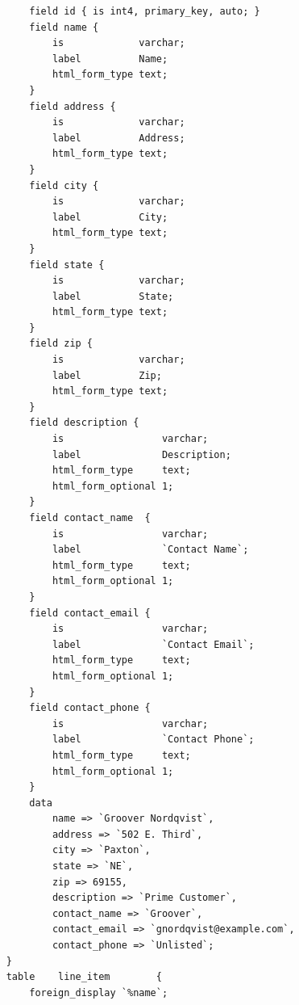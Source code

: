 \begin{verbatim}
        field id { is int4, primary_key, auto; }
        field name {
            is             varchar;
            label          Name;
            html_form_type text;
        }
        field address {
            is             varchar;
            label          Address;
            html_form_type text;
        }
        field city {
            is             varchar;
            label          City;
            html_form_type text;
        }
        field state {
            is             varchar;
            label          State;
            html_form_type text;
        }
        field zip {
            is             varchar;
            label          Zip;
            html_form_type text;
        }
        field description {
            is                 varchar;
            label              Description;
            html_form_type     text;
            html_form_optional 1;
        }
        field contact_name  {
            is                 varchar;
            label              `Contact Name`;
            html_form_type     text;
            html_form_optional 1;
        }
        field contact_email {
            is                 varchar;
            label              `Contact Email`;
            html_form_type     text;
            html_form_optional 1;
        }
        field contact_phone {
            is                 varchar;
            label              `Contact Phone`;
            html_form_type     text;
            html_form_optional 1;
        }
        data
            name => `Groover Nordqvist`,
            address => `502 E. Third`,
            city => `Paxton`,
            state => `NE`,
            zip => 69155,
            description => `Prime Customer`,
            contact_name => `Groover`,
            contact_email => `gnordqvist@example.com`,
            contact_phone => `Unlisted`;
    }
    table    line_item        {
        foreign_display `%name`;


\end{verbatim}
